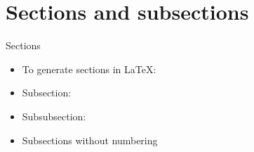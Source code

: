 \documentclass[10pt, notes]{beamer}
\subtitle{Part I: Writing papers using \LaTeX}
\begin{document}
\begin{frame}
  \titlepage
\end{frame}
\section{Sections and subsections}

\begin{frame}{Sections}
\begin{itemize}
\item To generate sections in \LaTeX: 
\item Subsection: 
\item Subsubsection: 
\item Subsections without numbering 

\end{itemize}
\end{frame}



\end{document}
